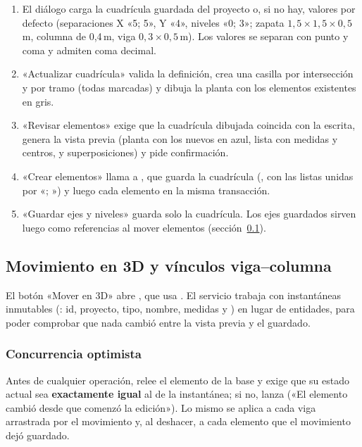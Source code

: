 \begin{enumerate}
	\item El diálogo carga la cuadrícula guardada del proyecto o, si no hay, valores por defecto (separaciones X
	      «5; 5», Y «4», niveles «0; 3»; zapata $1{,}5 \times 1{,}5 \times 0{,}5$\,m, columna de 0,4\,m, viga
	      $0{,}3 \times 0{,}5$\,m). Los valores se separan con punto y coma y admiten coma decimal.
	\item «Actualizar cuadrícula» valida la definición, crea una casilla por intersección y por tramo (todas marcadas) y
	      dibuja la planta con los elementos existentes en gris.
	\item «Revisar elementos» exige que la cuadrícula dibujada coincida con la escrita, genera la vista previa (planta
	      con los nuevos en azul, lista con medidas y centros, y superposiciones) y pide confirmación.
	\item «Crear elementos» llama a , que guarda la cuadrícula
	      (, con las listas unidas por «; ») y luego cada elemento en la misma transacción.
	\item «Guardar ejes y niveles» guarda solo la cuadrícula. Los ejes guardados sirven luego como referencias al mover
	      elementos (sección~\ref{sec:mod-movimiento}).
\end{enumerate}

\subsection{Movimiento en 3D y vínculos viga--columna}
\label{sec:mod-movimiento}

El botón «Mover en 3D» abre , que usa . El servicio
trabaja con instantáneas inmutables (: id, proyecto, tipo, nombre, medidas y ) en lugar de
entidades, para poder comprobar que nada cambió entre la vista previa y el guardado.

\subsubsection{Concurrencia optimista}

Antes de cualquier operación,  relee el elemento de la base y exige
que su estado actual sea \textbf{exactamente igual} al de la instantánea; si no, lanza
 («El elemento cambió desde que comenzó la edición»). Lo mismo se aplica a cada viga
arrastrada por el movimiento y, al deshacer, a cada elemento que el movimiento dejó guardado.

